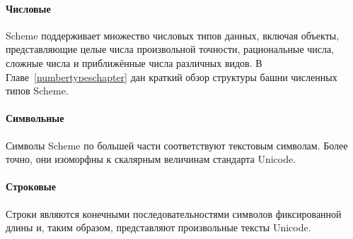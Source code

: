 \paragraph{Числовые}\vspace{1mm}

Scheme поддерживает множество числовых типов данных, включая
объекты, представляющие целые числа произвольной точности, рациональные числа, сложные числа и
приближённые числа различных видов. В Главе~\ref{numbertypeschapter} дан краткий обзор структуры
башни численных типов Scheme.\vspace{1mm}

\paragraph{Символьные}\vspace{1mm}

Символы Scheme по большей части соответствуют текстовым символам. Более точно,
они изоморфны к скалярным величинам стандарта Unicode.

\paragraph{Строковые}

Строки являются конечными последовательностями символов фиксированной длины и,
таким образом, представляют произвольные тексты Unicode.

